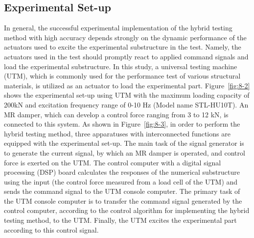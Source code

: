 \subsection{Experimental Set-up}
In general, the successful experimental implementation of the hybrid testing method with high accuracy depends strongly on the dynamic performance of the actuators used to excite the experimental substructure in the test. Namely, the actuators used in the test should promptly react to applied command signals and load the experimental substructure. In this study, a universal testing machine (UTM), which is commonly used for the performance test of various structural materials, is utilized as an actuator to load the experimental part. Figure~\ref{fig:8-2} shows the experimental set-up using UTM with the maximum loading capacity of 200kN and excitation frequency range of 0-10 Hz (Model name STL-HU10T). An MR damper, which can develop a control force ranging from 3 to 12 kN, is connected to this system. As shown in Figure~\ref{fig:8-3}, in order to perform the hybrid testing method, three apparatuses with interconnected functions are equipped with the experimental set-up. The main task of the signal generator is to generate the current signal, by which an MR damper is operated, and control force is exerted on the UTM. The control computer with a digital signal processing (DSP) board calculates the responses of the numerical substructure using the input (the control force measured from a load cell of the UTM) and sends the command signal to the UTM console computer. The primary task of the UTM console computer is to transfer the command signal generated by the control computer, according to the control algorithm for implementing the hybrid testing method, to the UTM. Finally, the UTM excites the experimental part according to this control signal.

